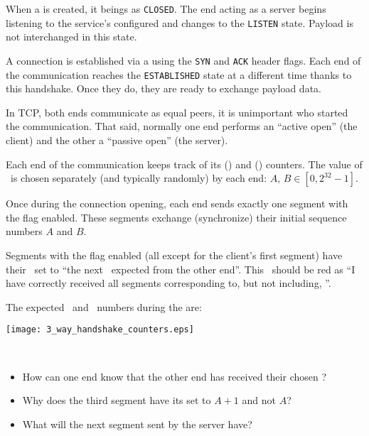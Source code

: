 When a  is created, it beings as \texttt{CLOSED}. 
The end acting as a server begins listening to the service's configured 
and changes to the \texttt{LISTEN} state. Payload is not interchanged in this state.

A connection is established via a  using the 
\texttt{SYN} and \texttt{ACK} header flags.
% 
Each end of the communication reaches the \texttt{ESTABLISHED} state at a different time thanks to 
this handshake. 
Once they do, they are ready to exchange payload data.

\begin{remark}
In TCP, both ends communicate as equal peers, it is unimportant who started the communication. 
That said, normally one end performs an ``active open'' (the client) 
and the other a ``passive open'' (the server).
\end{remark}

Each end of the communication keeps track of its 
 (\nack) and  (\nseq) counters.
% 
The value of \nseq\ is chosen separately (and typically randomly) by each end: 
$A,\,B \in [0, 2^{32} - 1]$. 

Once during the connection opening, each end sends exactly one segment with the  flag enabled. 
These segments exchange (synchronize) their initial sequence numbers $A$ and $B$.

Segments with the  flag enabled (all except for the client's first segment) 
have their \nack\ set to ``the next \nseq\ expected from the other end''. 
This \nack\ should be red as ``I have correctly received all segments corresponding to,
but not including, \nack''. 


The expected \nack\ and \nseq\ numbers during the  are: 
\begin{center}
\texttt{[image: 3\_way\_handshake\_counters.eps]}
\end{center}

\begin{exercise}\ \\[-0.5cm]
\begin{itemize}
\item How can one end know that the other end has received their chosen \nseq?
\item Why does the third segment have its \nseq set to $A+1$ and not $A$?
\item What \nseq will the next segment sent by the server have?
\end{itemize}
\end{exercise}



